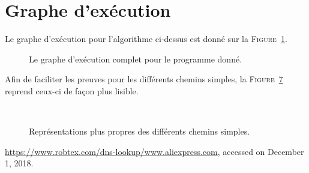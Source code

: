 \documentclass{elsarticle}
\begin{document}
\section{Graphe d'exécution}
Le graphe d'exécution pour l'algorithme ci-dessus est donné sur la \textsc{Figure}~\ref{fig:execgraph}.
\begin{figure}[htbp]
	\centering
	
	\caption{Le graphe d'exécution complet pour le programme donné.}
	\label{fig:execgraph}
\end{figure}
Afin de faciliter les preuves pour les différents chemins simples,
la \textsc{Figure}~\ref{fig:simplepaths} reprend ceux-ci de façon plus lisible.
\begin{figure}[htbp]
\centering
	\begin{subfigure}{0.3\textwidth}
	\centering
	
	\label{fig:1}
	\end{subfigure}\hspace{3cm}
	\begin{subfigure}{0.3\textwidth}
	\centering
	
	\label{fig:2}
	\end{subfigure}\\
	\begin{subfigure}{0.3\textwidth}
	\centering
	
	\label{fig:3}
	\end{subfigure}\hfill
	\begin{subfigure}{0.3\textwidth}
	\centering
	
	\label{fig:4}
	\end{subfigure}\hfill
	\begin{subfigure}{0.3\textwidth}
	\centering
	
	\label{fig:5}
	\end{subfigure}
	\caption{Représentations plus propres des différents chemins simples.}
	\label{fig:simplepaths}
\end{figure}

\begin{thebibliography}{00}
	 \url{https://www.robtex.com/dns-lookup/www.aliexpress.com}, accessed on December 1, 2018.
\end{thebibliography}
\end{document}
